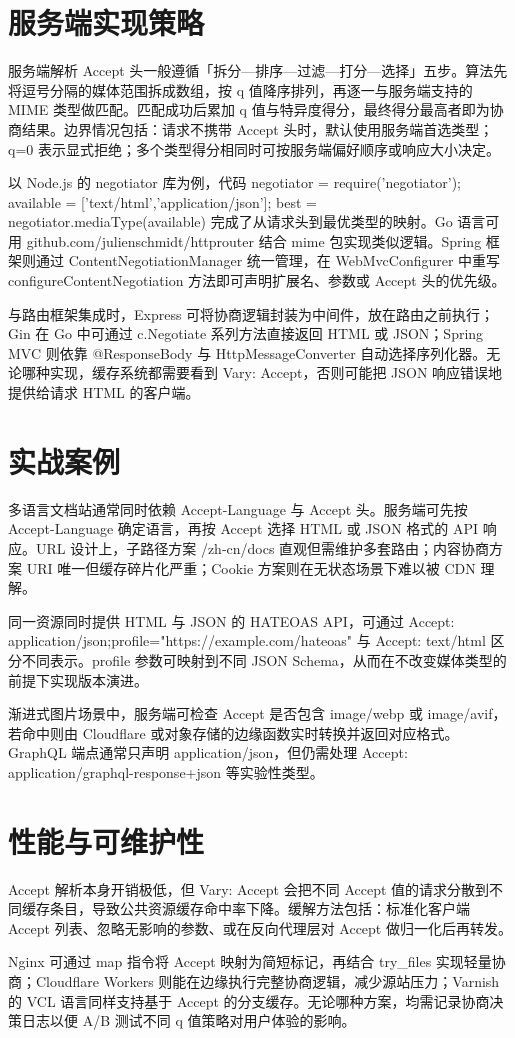 \chapter{服务端实现策略}
服务端解析 Accept 头一般遵循「拆分—排序—过滤—打分—选择」五步。算法先将逗号分隔的媒体范围拆成数组，按 q 值降序排列，再逐一与服务端支持的 MIME 类型做匹配。匹配成功后累加 q 值与特异度得分，最终得分最高者即为协商结果。边界情况包括：请求不携带 Accept 头时，默认使用服务端首选类型；q=0 表示显式拒绝；多个类型得分相同时可按服务端偏好顺序或响应大小决定。\par
以 Node.js 的 negotiator 库为例，代码 negotiator = require('negotiator'); available = ['text/html','application/json']; best = negotiator.mediaType(available) 完成了从请求头到最优类型的映射。Go 语言可用 github.com/julienschmidt/httprouter 结合 mime 包实现类似逻辑。Spring 框架则通过 ContentNegotiationManager 统一管理，在 WebMvcConfigurer 中重写 configureContentNegotiation 方法即可声明扩展名、参数或 Accept 头的优先级。\par
与路由框架集成时，Express 可将协商逻辑封装为中间件，放在路由之前执行；Gin 在 Go 中可通过 c.Negotiate 系列方法直接返回 HTML 或 JSON；Spring MVC 则依靠 @ResponseBody 与 HttpMessageConverter 自动选择序列化器。无论哪种实现，缓存系统都需要看到 Vary: Accept，否则可能把 JSON 响应错误地提供给请求 HTML 的客户端。\par
\chapter{实战案例}
多语言文档站通常同时依赖 Accept-Language 与 Accept 头。服务端可先按 Accept-Language 确定语言，再按 Accept 选择 HTML 或 JSON 格式的 API 响应。URL 设计上，子路径方案 /zh-cn/docs 直观但需维护多套路由；内容协商方案 URI 唯一但缓存碎片化严重；Cookie 方案则在无状态场景下难以被 CDN 理解。\par
同一资源同时提供 HTML 与 JSON 的 HATEOAS API，可通过 Accept: application/json;profile="https://example.com/hateoas" 与 Accept: text/html 区分不同表示。profile 参数可映射到不同 JSON Schema，从而在不改变媒体类型的前提下实现版本演进。\par
渐进式图片场景中，服务端可检查 Accept 是否包含 image/webp 或 image/avif，若命中则由 Cloudflare 或对象存储的边缘函数实时转换并返回对应格式。GraphQL 端点通常只声明 application/json，但仍需处理 Accept: application/graphql-response+json 等实验性类型。\par
\chapter{性能与可维护性}
Accept 解析本身开销极低，但 Vary: Accept 会把不同 Accept 值的请求分散到不同缓存条目，导致公共资源缓存命中率下降。缓解方法包括：标准化客户端 Accept 列表、忽略无影响的参数、或在反向代理层对 Accept 做归一化后再转发。\par
Nginx 可通过 map 指令将 Accept 映射为简短标记，再结合 try\_{}files 实现轻量协商；Cloudflare Workers 则能在边缘执行完整协商逻辑，减少源站压力；Varnish 的 VCL 语言同样支持基于 Accept 的分支缓存。无论哪种方案，均需记录协商决策日志以便 A/B 测试不同 q 值策略对用户体验的影响。\par
